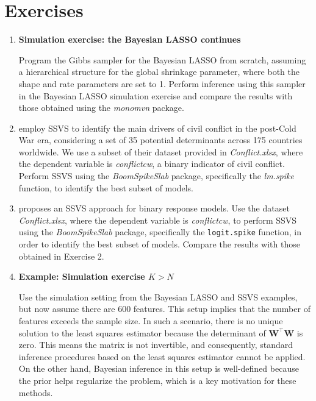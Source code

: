 \section{Exercises}\label{13_7}

\begin{enumerate}
	\item \textbf{Simulation exercise: the Bayesian LASSO continues}
	
	Program the Gibbs sampler for the Bayesian LASSO from scratch, assuming a hierarchical structure for the global shrinkage parameter, where both the shape and rate parameters are set to 1. Perform inference using this sampler in the Bayesian LASSO simulation exercise and compare the results with those obtained using the \textit{monomvn} package.
	
	\item \cite{jetter2022postcold} employ SSVS to identify the main drivers of civil conflict in the post-Cold War era, considering a set of 35 potential determinants across 175 countries worldwide. We use a subset of their dataset provided in \textit{Conflict.xlsx}, where the dependent variable is \textit{conflictcw}, a binary indicator of civil conflict. Perform SSVS using the \textit{BoomSpikeSlab} package, specifically the \textit{lm.spike} function, to identify the best subset of models.
	
	\item \cite{tuchler2008bayesian} proposes an SSVS approach for binary response models. Use the dataset \textit{Conflict.xlsx}, where the dependent variable is \textit{conflictcw}, to perform SSVS using the \textit{BoomSpikeSlab} package, specifically the \texttt{logit.spike} function, in order to identify the best subset of models. Compare the results with those obtained in Exercise 2.
	
	\item \textbf{Example: Simulation exercise $K > N$}
	
	Use the simulation setting from the Bayesian LASSO and SSVS examples, but now assume there are 600 features. This setup implies that the number of features exceeds the sample size. In such a scenario, there is no unique solution to the least squares estimator because the determinant of $\mathbf{W}^{\top} \mathbf{W}$ is zero. This means the matrix is not invertible, and consequently, standard inference procedures based on the least squares estimator cannot be applied. On the other hand, Bayesian inference in this setup is well-defined because the prior helps regularize the problem, which is a key motivation for these methods.
	  
\end{enumerate}

